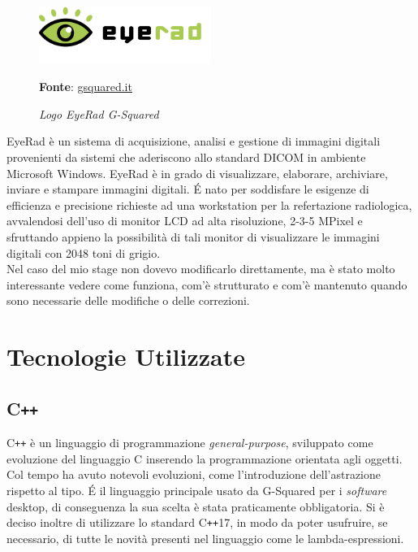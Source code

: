 \begin{figure}[h]
    \centering
    \includegraphics[width=0.5\textwidth]{immagini/logo-software-eyerad.png}
    \caption{\textit{Logo EyeRad G-Squared}}
    \textbf{Fonte}: \href{https://www.gsquared.it/it/pacs-ris-web-gateway-dicom-ihe-2/software-immagini-medicali/12-eyerad-refertazione-digitale}{gsquared.it}
    \label{fig: Logo software EyeRad G-Squared}
\end{figure}

EyeRad è un sistema di acquisizione, analisi e gestione di immagini digitali provenienti da sistemi che aderiscono allo standard DICOM in ambiente Microsoft Windows.
EyeRad è in grado di visualizzare, elaborare, archiviare, inviare e stampare immagini digitali.
\'E nato per soddisfare le esigenze di efficienza e precisione richieste ad una workstation per la refertazione radiologica, avvalendosi dell'uso di monitor LCD ad alta risoluzione, 2-3-5 MPixel e sfruttando appieno la possibilità di tali monitor di visualizzare le immagini digitali con 2048 toni di grigio.
\\
Nel caso del mio stage non dovevo modificarlo direttamente, ma è stato molto interessante vedere come funziona, com'è strutturato e com'è mantenuto quando sono necessarie delle modifiche o delle correzioni.

\section{Tecnologie Utilizzate}
\subsection{C\texttt{++}}\label{sec:C++}
C\texttt{++} è un linguaggio di programmazione \emph{general-purpose}, sviluppato come evoluzione del linguaggio C inserendo la programmazione orientata agli oggetti. Col tempo ha avuto notevoli evoluzioni, come l'introduzione dell'astrazione rispetto al tipo. \'E il linguaggio principale usato da G-Squared per i \emph{software} desktop, di conseguenza la sua scelta è stata praticamente obbligatoria. Si è deciso inoltre di utilizzare lo standard C\texttt{++}17, in modo da poter usufruire, se necessario, di tutte le novità presenti nel linguaggio come le lambda-espressioni.

